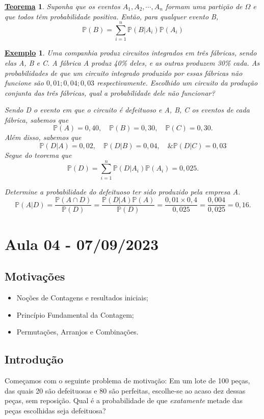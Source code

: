 \documentclass{article}
\newtheorem*{theorem*}{\underline{Teorema}}
\newtheorem{example}{\underline{Exemplo}}
\begin{document}
\begin{theorem*}
  Suponha que os eventos \(A_{1}, A_{2}, \cdots, A_{n}\) formam uma partição de \(\Omega \) e que todos têm probabilidade positiva. Então, para qualquer evento B, 
    \[
      \mathbb{P}(B) = \sum\limits_{i=1}^{n}\mathbb{P}(B|A_{i})\mathbb{P}(A_{i})
    \]
\end{theorem*}
\begin{example}
  Uma companhia produz circuitos integrados em três fábricas, sendo elas A, B e C. A fábrica A produz 40\% deles, e as outras produzem 30\% cada. As probabilidades de que um circuito integrado produzido por essas fábricas não funcione são 
 \(0,01; 0,04; 0,03\) respectivamente. Escolhido um circuito da produção conjunta das três fábricas, qual a probabilidade dele não funcionar? 
  
  Sendo D o evento em que o circuito é defeituoso e A, B, C os eventos de cada fábrica, sabemos que 
    \[
      \mathbb{P}(A) = 0,40,\quad \mathbb{P}(B) = 0,30,\quad \mathbb{P}(C) = 0,30.
    \]
    Além disso, sabemos que 
    \[
      \mathbb{P}(D|A) = 0,02,\quad \mathbb{P}(D|B) = 0,04,\quad \& \mathbb{P}(D|C) = 0,03
    \]
    Segue do teorema que 
      \[
        \mathbb{P}(D) = \sum\limits_{i=1}^{n}\mathbb{P}(D|A_{i})\mathbb{P}(A_{i}) = 0,025.
      \]

    Determine a probabilidade do defeituoso ter sido produzido pela empresa A. 
      \[
        \mathbb{P}(A|D) = \frac{\mathbb{P}(A\cap D)}{\mathbb{P}(D)} = \frac{\mathbb{P}(D|A)\mathbb{P}(A)}{\mathbb{P}(D)} = \frac{0,01\times 0,4}{0,025} = \frac{0,004}{0,025} = 0,16.
      \]
\end{example}
\newpage

\section{Aula 04 - 07/09/2023}
\subsection{Motivações}
\begin{itemize}
  \item Noções de Contagens e resultados iniciais;
  \item Princípio Fundamental da Contagem;
  \item Permutações, Arranjos e Combinações.
\end{itemize}
\subsection{Introdução}
  Começamos com o seguinte problema de motivação: Em um lote de 100 peças, das quais
20 são defeituosas e 80 são perfeitas, escolhe-se ao acaso dez dessas peças, sem reposição.
Qual é a probabilidade de que \textit{exatamente} metade das peças escolhidas seja defeituosa?
\end{document}
